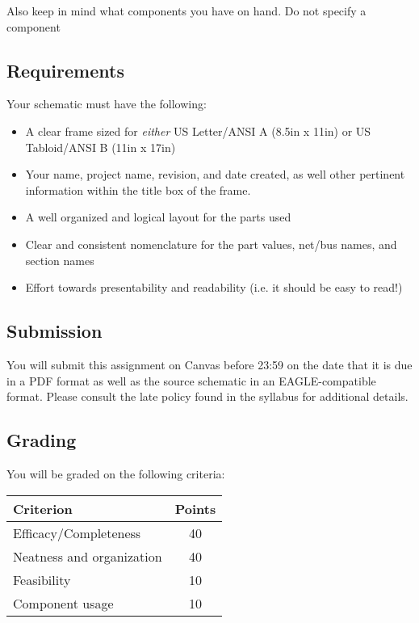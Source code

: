 Also keep in mind what components you have on hand.
Do not specify a component 

    \subsection*{Requirements}
    Your schematic must have the following:
    \begin{itemize}
        \item A clear frame sized for \emph{either} US Letter/ANSI A (8.5in x 11in) or US Tabloid/ANSI B (11in x 17in)
        \item Your name, project name, revision, and date created, as well other pertinent information within the title box of the frame.
        \item A well organized and logical layout for the parts used
        \item Clear and consistent nomenclature for the part values, net/bus names, and section names
        \item Effort towards presentability and readability (i.e. it should be easy to read!)
    \end{itemize}

    \subsection*{Submission}
    You will submit this assignment on Canvas before 23:59 on the date that it is due in a PDF format as well as the source schematic in an EAGLE-compatible format.
    Please consult the late policy found in the syllabus for additional details.

    \subsection*{Grading}
    You will be graded on the following criteria:

    \begin{table}[h!]
        \begin{tabular}{l | c}
            \toprule
            Criterion & Points \\

            \midrule
            Efficacy/Completeness & 40 \\
            Neatness and organization & 40 \\
            Feasibility & 10 \\
            Component usage & 10 \\
            \bottomrule
        \end{tabular}
    \end{table}

